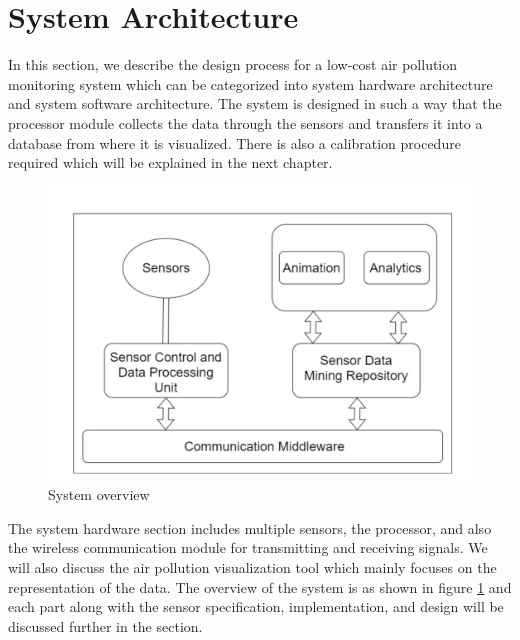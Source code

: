 \section{System Architecture}
    

     In this section, we describe the design process for a low-cost air pollution monitoring system which can be categorized into system hardware architecture and system software architecture. The system is designed in such a way that the processor module collects the data through the sensors and transfers it into a database from where it is visualized. There is also a calibration procedure required which will be explained in the next chapter.
     \begin{figure}[h]
      \begin{center}
      \includegraphics[scale=0.65]{images/figure2.png}
      \end{center}
      
      \caption{System overview}
      \label{overview}
  
    \end{figure}

  \hspace{1 cm}


    The system hardware section includes multiple sensors, the processor, and also the wireless communication module for transmitting and receiving signals. We will also discuss the air pollution visualization tool which mainly focuses on the representation of the data. The overview of the system is as shown in figure \ref{overview} and each part along with the sensor specification, implementation, and design will be discussed further in the section. 
    
